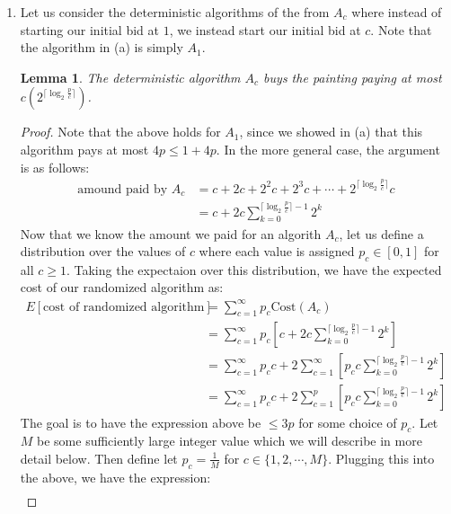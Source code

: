 \documentclass[12pt]{exam}
\newtheorem{lemma}[theorem]{Lemma}
\begin{document}
\begin{questions}
\begin{solution}
\begin{enumerate}[label=(\alph*)]
    \item Let us consider the deterministic algorithms of the from $A_c$ where instead of starting our initial bid at $1$, we instead start our initial bid at $c$. Note that the algorithm in (a) is simply $A_1$.
    \begin{lemma}
      The deterministic algorithm $A_c$ buys the painting paying at most $c(2^{\lceil \log_2 \frac{p}{c} \rceil})$.
    \end{lemma}
    \begin{proof}
      Note that the above holds for $A_1$, since we showed in (a) that this algorithm pays at most $4p \leq 1 + 4p$. In the more general case, the argument is as follows:
      \begin{align*}
        \text{amound paid by $A_c$} &= c + 2c + 2^2c + 2^3c + \cdots + 2^{\lceil \log_2 \frac{p}{c} \rceil} c \tag{This are just the bids the algorithm submits} \\
        &= c + 2c \sum_{k=0}^{\lceil \log_2 \frac{p}{c} \rceil - 1} 2^k \tag{We alway bid $c$, and the rest is just writing in summation notation}
      \end{align*}
      Now that we know the amount we paid for an algorith $A_c$, let us define a distribution over the values of $c$ where each value is assigned $p_c \in [0,1]$ for all $c \geq 1$. Taking the expectaion over this distribution, we have the expected cost of our randomized algorithm as:
      \begin{align*}
        E[\text{cost of randomized algorithm}] &= \sum_{c=1}^{\infty} p_c \text{Cost}(A_c) \tag{Definition of expected value} \\
        &=  \sum_{c=1}^{\infty} p_c \left[c + 2c \sum_{k=0}^{\lceil \log_2 \frac{p}{c} \rceil - 1} 2^k\right] \\
        &= \sum_{c=1}^{\infty} p_c c + 2 \sum_{c=1}^{\infty} \left[ p_c c \sum_{k=0}^{\lceil \log_2 \frac{p}{c} \rceil - 1} 2^k \right] \\
        &= \sum_{c=1}^{\infty} p_c c + 2 \sum_{c=1}^{p} \left[ p_c c \sum_{k=0}^{\lceil \log_2 \frac{p}{c} \rceil - 1} 2^k \right]\tag{The inner summation is $0$ for $c > p$ since we win on the first bid}
      \end{align*}
      The goal is to have the expression above be $\leq 3p$ for some choice of $p_c$. Let $M$ be some sufficiently large integer value which we will describe in more detail below. Then define let $p_c = \frac{1}{M}$ for $c \in \{1, 2, \cdots, M \}$. Plugging this into the above, we have the expression:
      \begin{align*}

\end{align*}
\end{proof}
\end{enumerate}
\end{solution}
\end{questions}
\end{document}
